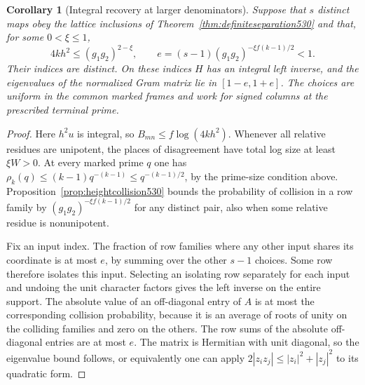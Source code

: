 \documentclass[a4paper,11pt]{article}
\newtheorem{corollary}[proposition]{Corollary}
\theoremstyle{definition}
\theoremstyle{remark}
\numberwithin{equation}{section}
\begin{document}
\begin{corollary}[Integral recovery at larger denominators]
\leavevmode\label{cor:markeddenominators530}
Suppose that \(s\) distinct maps obey the lattice inclusions of
Theorem~\ref{thm:definiteseparation530} and that, for some
\(0<\xi\le1\),
\[
      4kh^2\le(g_1g_2)^{2-\xi},\qquad
      e=(s-1)(g_1g_2)^{-\xi f(k-1)/2}<1 .
\]
Their indices are distinct. On these indices \(H\) has an integral
left inverse, and the eigenvalues of the normalized Gram matrix
lie in \([1-e,1+e]\). The choices are uniform in the common marked
frames and work for signed columns at the prescribed terminal prime.
\end{corollary}
\begin{proof}
Here \(h^2u\) is integral, so \(B_{mn}\le f\log(4kh^2)\).
Whenever all relative residues are unipotent, the places of
disagreement have total log size at least \(\xi W>0\).
At every marked prime \(q\) one has
\(\rho_k(q)\le(k-1)q^{-(k-1)}\le q^{-(k-1)/2}\), by the
prime-size condition above. Proposition~\ref{prop:heightcollision530}
bounds the probability of collision in a row family by
\((g_1g_2)^{-\xi f(k-1)/2}\) for any distinct pair, also when
some relative residue is nonunipotent.

Fix an input index. The fraction of row families where any other
input shares its coordinate is at most \(e\), by summing over the
other \(s-1\) choices. Some row therefore isolates this input.
Selecting an isolating row separately for each input and undoing
the unit character factors gives the left inverse on the entire
support. The absolute value of an off-diagonal entry of \(A\)
is at most the corresponding collision probability, because it
is an average of roots of unity on the colliding families and
zero on the others. The row sums of the absolute off-diagonal
entries are at most \(e\). The matrix is Hermitian with unit
diagonal, so the eigenvalue bound follows, or equivalently one
can apply \(2|z_i z_j|\le |z_i|^2+|z_j|^2\) to its quadratic form.
\end{proof}
\end{document}
